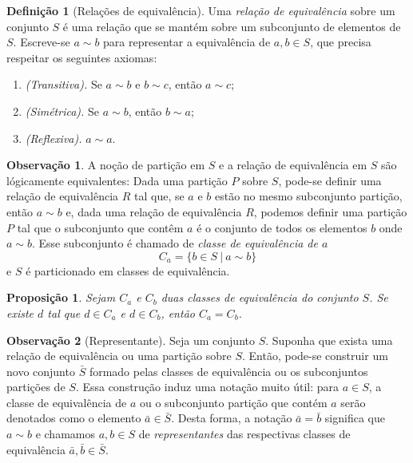\documentclass[a4paper,12pt]{report}
\theoremstyle{plain}
\newtheorem{proposicao}{Proposição}[section]
\theoremstyle{definition}
\newtheorem{definicao}{Definição}[section]
\newtheorem{observacao}{Observação}[section]
\begin{document}
	\begin{definicao}[Relações de equivalência]
		Uma \emph{relação de equivalência} sobre um conjunto
		\(S\) é uma relação que se mantém sobre um subconjunto de elementos de
		\(S\). Escreve-se \(a\sim b\) para representar a equivalência de
		\(a, b \in S\), que precisa respeitar os seguintes axiomas:
		\begin{enumerate}
			\item \emph{(Transitiva).} Se \(a\sim b\) e \(b\sim c\), então \(a\sim c\);
			\item \emph{(Simétrica).} Se \(a\sim b\), então \(b\sim a\);
			\item \emph{(Reflexiva).} \(a\sim a\).
		\end{enumerate}
	\end{definicao}
	
	\begin{observacao}
		A noção de partição em \(S\) e a relação de equivalência em \(S\) são
		lógicamente equivalentes: Dada uma partição \(P\) sobre \(S\), pode-se
		definir uma relação de equivalência \(R\) tal que, se \(a\) e \(b\)
		estão no mesmo subconjunto partição, então \(a\sim b\) e, dada uma
		relação de equivalência \(R\), podemos definir uma partição \(P\) tal
		que o subconjunto que contêm \(a\) é o conjunto de todos os elementos
		\(b\) onde \(a\sim b\). Esse subconjunto é chamado de \emph{classe de
			equivalência de \(a\)}
		\[C_a = \{b\in S \ | \ a\sim b\}\]
		e \(S\) é particionado em classes de equivalência.
	\end{observacao}
	
	\begin{proposicao}
		Sejam \(C_a\) e \(C_b\) duas classes de equivalência do conjunto \(S\). Se existe \(d\) tal que \(d\in C_a\) e \(d\in C_b\), então \(C_a = C_b\).
	\end{proposicao}
	
	\begin{observacao}[Representante]
		Seja um conjunto \(S\). Suponha que exista uma relação de equivalência
		ou uma partição sobre \(S\). Então, pode-se construir um novo conjunto
		\(\bar{S}\) formado pelas classes de equivalência ou os subconjuntos
		partições de \(S\). Essa construção induz uma notação muito útil: para
		\(a\in S\), a classe de equivalência de \(a\) ou o subconjunto partição
		que contém \(a\) serão denotados como o elemento
		\(\bar{a} \in \bar{S}\). Desta forma, a notação \(\bar{a} = \bar{b}\)
		significa que \(a \sim b\) e chamamos \(a,b \in S\) de
		\emph{representantes} das respectivas classes de equivalência
		\(\bar{a}, \bar{b} \in \bar{S}\).
	\end{observacao}
	
\end{document}
